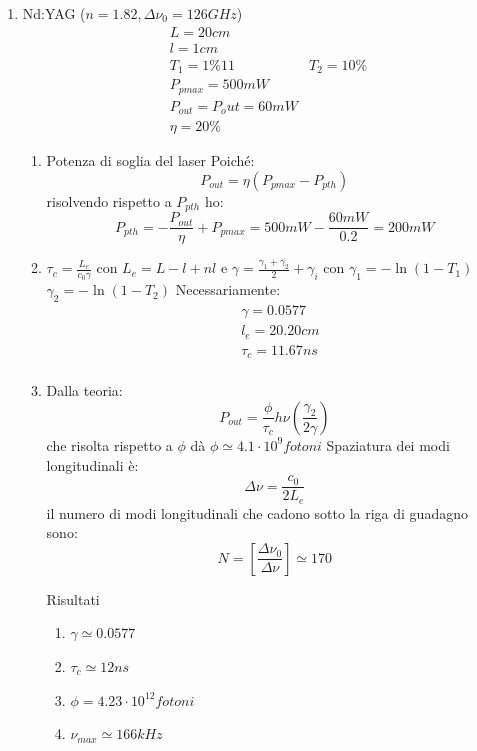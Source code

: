 \documentclass{book}
\def \D {\Delta}
\theoremstyle{remark}
\begin{document}
\begin{enumerate}
\item Nd:YAG ($n = 1.82, \D \nu_0 = 126 GHz$)
\begin{align*}
&L = 20 cm\\
&l = 1cm\\
&T_1 = 1\%11
&T_2 = 10\%\\
&P_{p max} = 500 mW\\
&P_{out} = P_out = 60 mW\\
&\eta = 20\%
\end{align*}
\begin{enumerate}
\item Potenza di soglia del laser
Poiché:
\begin{equation*}
P_{out} = \eta (P_{p max} - P_{p th})
\end{equation*}
risolvendo rispetto a $P_{p th}$ ho:
\begin{equation*}
P_{p th} = -\frac{P_{out}}{\eta} + P_{p max} = 500 mW - \frac{60 mW}{0.2} = 200 mW
\end{equation*}
\item $\tau_c = \frac{L_e}{c_0 \gamma}$ con $L_e = L - l + nl$ e $\gamma = \frac{\gamma_1 + \gamma_2}{2} + \gamma_i$ con $\gamma_1 = - \ln (1-T_1)$ $\gamma_2 = - \ln(1-T_2)$
Necessariamente:
\begin{align*}
&\gamma = 0.0577\\
&l_e = 20.20 cm\\
&\tau_c = 11.67 ns\\
\end{align*}

\item Dalla teoria:
\begin{equation*}
P_{out} = \frac{\phi}{\tau_c} h\nu \left(\frac{\gamma_2}{2\gamma}\right)
\end{equation*}
che risolta rispetto a $\phi$ dà $\phi \simeq 4.1 \cdot 10^9 fotoni$
Spaziatura dei modi longitudinali è:
\begin{equation*}
\D\nu = \frac{c_0}{2L_e}
\end{equation*}
il numero di modi longitudinali che cadono sotto la riga di guadagno sono:
\begin{equation*}
N = \left[\frac{\D\nu_0}{\D \nu}\right] \simeq 170
\end{equation*}

\item [Risultati]
\begin{enumerate}
\item $\gamma \simeq 0.0577$
\item $\tau_c \simeq 12 ns$
\item $\phi = 4.23 \cdot 10^{12} fotoni$
\item $\nu_{max} \simeq 166 kHz$
\end{enumerate}
\end{enumerate}
\end{enumerate}
\end{document}
